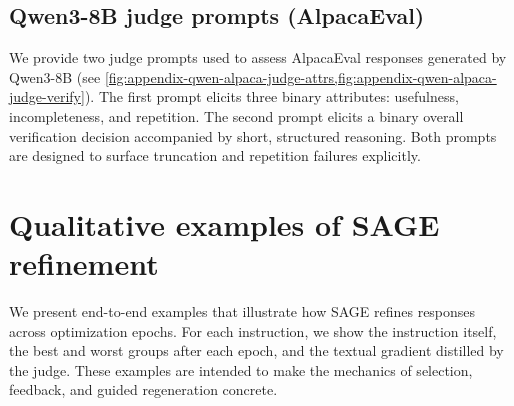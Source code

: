 \documentclass[11pt]{article}
\theoremstyle{plain}
\theoremstyle{definition}
\theoremstyle{remark}
\newcommand{\method}{SAGE}
\begin{document}
\subsection{Qwen3-8B judge prompts (AlpacaEval)}
We provide two judge prompts used to assess AlpacaEval responses generated by Qwen3-8B (see \cref{fig:appendix-qwen-alpaca-judge-attrs,fig:appendix-qwen-alpaca-judge-verify}). The first prompt elicits three binary attributes: usefulness, incompleteness, and repetition. The second prompt elicits a binary overall verification decision accompanied by short, structured reasoning. Both prompts are designed to surface truncation and repetition failures explicitly.

\section{Qualitative examples of SAGE refinement}
We present end-to-end examples that illustrate how \method{} refines responses across optimization epochs. For each instruction, we show the instruction itself, the best and worst groups after each epoch, and the textual gradient distilled by the judge. These examples are intended to make the mechanics of selection, feedback, and guided regeneration concrete.
\end{document}
